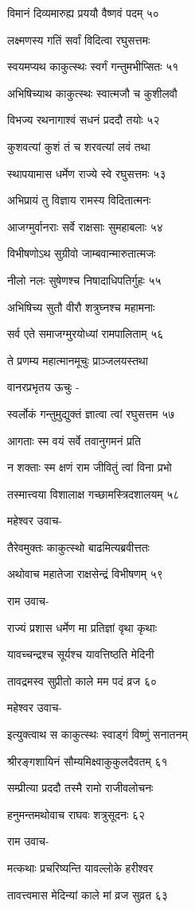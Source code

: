 विमानं दिव्यमारुह्य प्रययौ वैष्णवं पदम् ५०

लक्ष्मणस्य गतिं सर्वां विदित्वा रघुसत्तमः

स्वयमप्यथ काकुत्स्थः स्वर्गं गन्तुमभीप्सितः ५१

अभिषिच्याथ काकुत्स्थः स्वात्मजौ च कुशीलवौ

विभज्य रथनागाश्वं सधनं प्रददौ तयोः ५२

कुशवत्यां कुशं तं च शरवत्यां लवं तथा

स्थापयामास धर्मेण राज्ये स्वे रघुसत्तमः ५३

अभिप्रायं तु विज्ञाय रामस्य विदितात्मनः

आजग्मुर्वानराः सर्वे राक्षसाः सुमहाबलाः ५४

विभीषणोऽथ सुग्रीवो जाम्बवान्मारुतात्मजः

नीलो नलः सुषेणश्च निषादाधिपतिर्गुहः ५५

अभिषिच्य सुतौ वीरौ शत्रुघ्नश्च महामनाः

सर्व एते समाजग्मुरयोध्यां रामपालिताम् ५६

ते प्रणम्य महात्मानमूचुः प्राञ्जलयस्तथा

वानरप्रभृतय ऊचुः -

स्वर्लोकं गन्तुमुद्युक्तं ज्ञात्वा त्वां रघुसत्तम ५७

आगताः स्म वयं सर्वे तवानुगमनं प्रति

न शक्ताः स्म क्षणं राम जीवितुं त्वां विना प्रभो

तस्मात्त्वया विशालाक्ष गच्छामस्त्रिदशालयम् ५८

महेश्वर उवाच-

तैरेवमुक्तः काकुत्स्थो बाढमित्यब्रवीत्ततः

अथोवाच महातेजा राक्षसेन्द्रं विभीषणम् ५९

राम उवाच-

राज्यं प्रशास धर्मेण मा प्रतिज्ञां वृथा कृथाः

यावच्चन्द्रश्च सूर्यश्च यावत्तिष्ठति मेदिनी

तावद्रमस्व सुप्रीतो काले मम पदं व्रज ६०

महेश्वर उवाच-

इत्युक्त्वाथ स काकुत्स्थः स्वाड्गं विष्णुं सनातनम्

श्रीरङ्गशायिनं सौम्यमिक्ष्वाकुकुलदैवतम् ६१

सम्प्रीत्या प्रददौ तस्मै रामो राजीवलोचनः

हनुमन्तमथोवाच राघवः शत्रुसूदनः ६२

राम उवाच-

मत्कथाः प्रचरिष्यन्ति यावल्लोके हरीश्वर

तावत्त्वमास मेदिन्यां काले मां व्रज सुव्रत ६३

